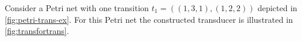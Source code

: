 Consider a Petri net with one transition $t_{1} = ((1,3,1),(1,2,2))$ depicted in \autoref{fig:petri-trans-ex}.
For this Petri net the constructed transducer is illustrated in \autoref{fig:transfortrans}. 


%
%		
%    
%    
%		
%        
